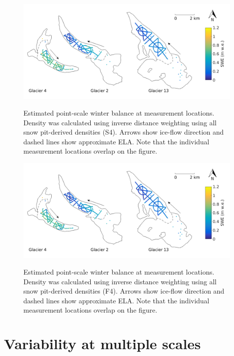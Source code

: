 \documentclass{sfuthesis}
\begin{document}
\begin{figure}[H]
	\centering
	\includegraphics[width = \textwidth]{SWEmap_opt8.png}\\
	\caption{Estimated point-scale winter balance at measurement locations. Density was calculated using inverse distance weighting using all snow pit-derived densities (S4). Arrows show ice-flow direction and dashed lines show approximate ELA. Note that the individual measurement locations overlap on the figure.}
	\label{fig:SWEmap_S4}
\end{figure}

\begin{figure}[H]
	\centering
	\includegraphics[width =\textwidth]{SWEmap_opt9.png}\\
	\caption{Estimated point-scale winter balance at measurement locations. Density was calculated using inverse distance weighting using all snow pit-derived densities (F4). Arrows show ice-flow direction and dashed lines show approximate ELA. Note that the individual measurement locations overlap on the figure.}
	\label{fig:SWEmap_F4}
\end{figure}


\section{Variability at multiple scales}
\end{document}
